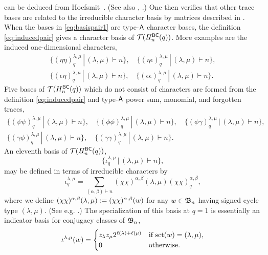 \documentclass[11pt]{article}
\theoremstyle{definition}
\numberwithin{equation}{section}
\begin{document}
can be deduced from Hoefsmit~\cite[\S 2.2]{HoefsmitThesis}.
(See also \cite{DJRepHeckeB}, \cite[\S 5.5]{GPCharHecke}.)
One then verifies that other trace bases are related
to the irreducible character basis by
matrices described in \cite[\S 3]{RemTrans}.
When the bases in \eqref{eq:basispair1} are type-$\mathsf{A}$ character bases,
the definition \eqref{eq:inducedpair} gives a character basis of
$\mathcal{T}(H_n^{\mathsf{BC}}(q))$.
More examples are the
induced one-dimensional characters,
\begin{equation*}
  \begin{gathered}
\{ (\eta\eta)_q^{\lambda,\mu} \,|\, (\lambda,\mu) \vdash n \}, \quad
\{ (\eta\epsilon)_q^{\lambda,\mu} \,|\, (\lambda,\mu) \vdash n \},\\
\{ (\epsilon\eta)_q^{\lambda,\mu} \,|\, (\lambda,\mu) \vdash n \},\quad
\{ (\epsilon\epsilon)_q^{\lambda,\mu} \,|\, (\lambda,\mu) \vdash n \}.
\end{gathered}
\end{equation*}
Five
bases of $\mathcal{T}(H_n^{\mathsf{BC}}(q))$ which do not consist of characters are
formed from
the definition \eqref{eq:inducedpair} and
type-$\mathsf{A}$ power sum, monomial, and forgotten traces,
\begin{equation*}
  \begin{gathered}
    \{ (\psi\psi)_q^{\lambda,\mu} \,|\, (\lambda,\mu) \vdash n \}, \quad
\{ (\phi\phi)_q^{\lambda,\mu} \,|\, (\lambda,\mu) \vdash n \}, \quad
\{ (\phi\gamma)_q^{\lambda,\mu} \,|\, (\lambda,\mu) \vdash n \}, \\
\{ (\gamma\phi)_q^{\lambda,\mu} \,|\, (\lambda,\mu) \vdash n \},\quad
\{ (\gamma\gamma)_q^{\lambda,\mu} \,|\, (\lambda,\mu) \vdash n \}.
\end{gathered}
\end{equation*}
An eleventh basis of $\mathcal{T}(H_n^{\mathsf{BC}}(q))$,
\begin{equation*}
  \{ \iota_q^{\lambda,\mu} \,|\, (\lambda,\mu) \vdash n\},
\end{equation*}
may be defined in terms of irreducible characters by
\begin{equation}\label{eq:iotaqdef}
  \iota_q^{\lambda,\mu} =
  \sum_{(\alpha,\beta) \vdash n} (\chi\chi)^{\alpha,\beta}(\lambda,\mu)
  (\chi\chi)_q^{\alpha,\beta},
\end{equation}
where
we define
$(\chi\chi)^{\alpha,\beta}(\lambda,\mu) := (\chi\chi)^{\alpha,\beta}(w)$
for any $w \in \mathfrak{B}_n$ having signed cycle type
$(\lambda,\mu)$. (See e.g. \cite{AAERCharFormulasHyper}.)
The specialization of this basis at $q=1$
is 
essentially an indicator basis for conjugacy classes of $\mathfrak{B}_n$,
\begin{equation}\label{eq:iotadef}
  \iota^{\lambda,\mu}(w) = \begin{cases}
    z_\lambda z_\mu 2^{\ell(\lambda)+\ell(\mu)}
    &\text{if $\sct(w) = (\lambda,\mu)$},\\
    0 &\text{otherwise}.
  \end{cases}
\end{equation}
\end{document}
